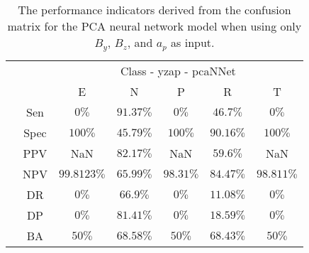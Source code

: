 \begin{table}[!ht]
	\centering
	\begin{tabular}{|c|c|c|c|c|c|c|}
		\cline{3-7}
		\multicolumn{2}{c|}{} & \multicolumn{5}{c|}{Class - yzap - pcaNNet} \\ \cline{3-7}
		\multicolumn{2}{c|}{} & E & N & P & R & T \\ \hline
		\multirow{7}{*}{\rotatebox{90}{Statistics}} & Sen & $0\%$ & $91.37\%$ & $0\%$ & $46.7\%$ & $0\%$ \\ \cline{2-7}
		 & Spec & $100\%$ & $45.79\%$ & $100\%$ & $90.16\%$ & $100\%$ \\ \cline{2-7}
		 & PPV & NaN & $82.17\%$ & NaN & $59.6\%$ & NaN \\ \cline{2-7}
		 & NPV & $99.8123\%$ & $65.99\%$ & $98.31\%$ & $84.47\%$ & $98.811\%$ \\ \cline{2-7}
		 & DR & $0\%$ & $66.9\%$ & $0\%$ & $11.08\%$ & $0\%$ \\ \cline{2-7}
		 & DP & $0\%$ & $81.41\%$ & $0\%$ & $18.59\%$ & $0\%$ \\ \cline{2-7}
		 & BA & $50\%$ & $68.58\%$ & $50\%$ & $68.43\%$ & $50\%$ \\ \hline
	\end{tabular}
	\caption{The performance indicators derived from the confusion matrix for the PCA neural network model when using only $B_{y}$, $B_{z}$, and $a_{p}$ as input.}
	\label{tab:cs:reverse:yzap:pcaNNet}
\end{table}
